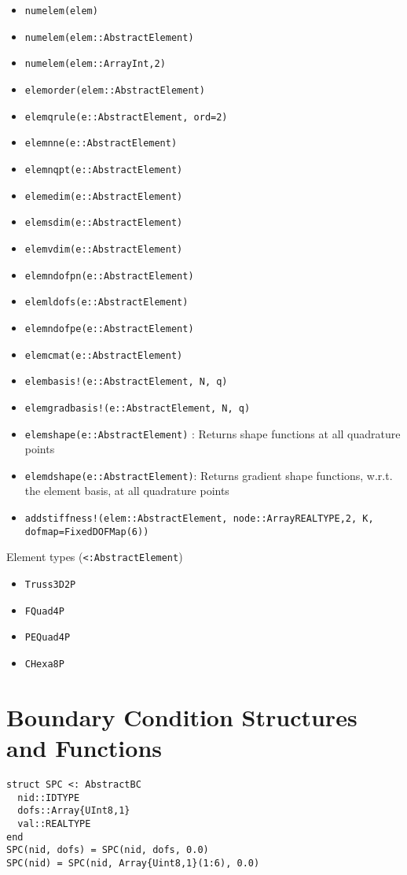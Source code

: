 \documentclass[11pt]{article} %
\begin{document}
\begin{itemize}
\item \texttt{numelem(elem)}
\item \texttt{numelem(elem::AbstractElement) }
\item \texttt{numelem(elem::Array{Int,2}) }
\item \texttt{elemorder(elem::AbstractElement) }
\item \texttt{elemqrule(e::AbstractElement, ord=2)} 
\item \texttt{elemnne(e::AbstractElement) }
\item \texttt{elemnqpt(e::AbstractElement) }
\item \texttt{elemedim(e::AbstractElement) }
\item \texttt{elemsdim(e::AbstractElement) }
\item \texttt{elemvdim(e::AbstractElement)}
\item \texttt{elemndofpn(e::AbstractElement)}
\item \texttt{elemldofs(e::AbstractElement) }
\item \texttt{elemndofpe(e::AbstractElement) }
\item \texttt{elemcmat(e::AbstractElement)}
\item \texttt{elembasis!(e::AbstractElement, N, q) }
\item \texttt{elemgradbasis!(e::AbstractElement, N, q) }
\item \texttt{elemshape(e::AbstractElement)} : Returns shape functions at all quadrature points
\item \texttt{elemdshape(e::AbstractElement)}: Returns gradient shape functions, w.r.t. the element basis, at all quadrature points
\item \texttt{addstiffness!(elem::AbstractElement, node::Array{REALTYPE,2}, K, dofmap=FixedDOFMap(6))}
\end{itemize}

Element types (\texttt{<:AbstractElement})
\begin{itemize}
\item \texttt{Truss3D2P}
\item \texttt{FQuad4P }
\item \texttt{PEQuad4P}
\item \texttt{CHexa8P}
\end{itemize}

\section{Boundary Condition Structures and Functions}
\begin{verbatim}
struct SPC <: AbstractBC
  nid::IDTYPE
  dofs::Array{UInt8,1}
  val::REALTYPE
end  
SPC(nid, dofs) = SPC(nid, dofs, 0.0)
SPC(nid) = SPC(nid, Array{Uint8,1}(1:6), 0.0)
\end{verbatim}
\end{document}
